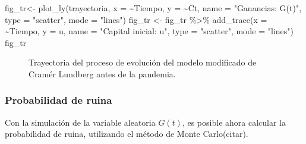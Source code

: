 \documentclass[
  us-letterpaper,
]{scrreprt}
\newenvironment{Shaded}{\begin{snugshade}}{\end{snugshade}}
\newcommand{\AttributeTok}[1]{\textcolor[rgb]{0.40,0.45,0.13}{#1}}
\newcommand{\FunctionTok}[1]{\textcolor[rgb]{0.28,0.35,0.67}{#1}}
\newcommand{\NormalTok}[1]{\textcolor[rgb]{0.00,0.23,0.31}{#1}}
\newcommand{\OtherTok}[1]{\textcolor[rgb]{0.00,0.23,0.31}{#1}}
\newcommand{\SpecialCharTok}[1]{\textcolor[rgb]{0.37,0.37,0.37}{#1}}
\newcommand{\StringTok}[1]{\textcolor[rgb]{0.13,0.47,0.30}{#1}}
\theoremstyle{plain}
\theoremstyle{plain}
\theoremstyle{definition}
\theoremstyle{remark}
\begin{document}
\begin{Shaded}
\begin{Highlighting}[]
\NormalTok{fig\_tr}\OtherTok{\textless{}{-}} \FunctionTok{plot\_ly}\NormalTok{(trayectoria, }\AttributeTok{x =} \SpecialCharTok{\textasciitilde{}}\NormalTok{Tiempo, }\AttributeTok{y =} \SpecialCharTok{\textasciitilde{}}\NormalTok{Ct, }
\AttributeTok{name =} \StringTok{"Ganancias: G(t)"}\NormalTok{, }\AttributeTok{type =} \StringTok{"scatter"}\NormalTok{, }\AttributeTok{mode =} \StringTok{"lines"}\NormalTok{)}
\NormalTok{fig\_tr }\OtherTok{\textless{}{-}}\NormalTok{ fig\_tr }\SpecialCharTok{\%\textgreater{}\%} \FunctionTok{add\_trace}\NormalTok{(}\AttributeTok{x =} \SpecialCharTok{\textasciitilde{}}\NormalTok{Tiempo, }\AttributeTok{y =}\NormalTok{ u,  }
\AttributeTok{name =} \StringTok{"Capital inicial: u"}\NormalTok{, }\AttributeTok{type =} \StringTok{"scatter"}\NormalTok{, }\AttributeTok{mode =} \StringTok{"lines"}\NormalTok{)}
\NormalTok{fig\_tr}
\end{Highlighting}
\end{Shaded}

\begin{figure}


\caption{\label{fig-fig-trayectoriapdf}Trayectoria del proceso de
evolución del modelo modificado de Cramér Lundberg antes de la
pandemia.}

\end{figure}%

\subsubsection{Probabilidad de ruina}\label{probabilidad-de-ruina}

Con la simulación de la variable aleatoria \(G(t)\), es posible ahora
calcular la probabilidad de ruina, utilizando el método de Monte
Carlo(citar).
\end{document}
